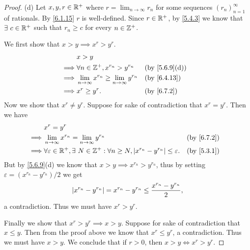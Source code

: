 \begin{proof}{(d)}
  Let \(x, y, r \in \mathbb{R}^+\) where \(r = \lim_{n \to \infty} r_n\) for some sequences \((r_n)_{n = 1}^\infty\) of rationals.
  By \cref{6.1.15} \(r\) is well-defined.
  Since \(r \in \mathbb{R}^+\), by \cref{5.4.3} we know that \(\exists\ c \in \mathbb{R}^+\) such that \(r_n \geq c\) for every \(n \in \mathbb{Z}^+\).

  We first show that \(x > y \implies x^r > y^r\).
  \begin{align*}
             & x > y                                                                                         \\
    \implies & \forall n \in \Z^+, x^{r_n} > y^{r_n}                        &  & \text{(by \cref{5.6.9}(d))} \\
    \implies & \lim_{n \to \infty} x^{r_n} \geq \lim_{n \to \infty} y^{r_n} &  & \text{(by \cref{6.4.13})}   \\
    \implies & x^r \geq y^r.                                                &  & \by{6.7.2}
  \end{align*}
  Now we show that \(x^r \neq y^r\).
  Suppose for sake of contradiction that \(x^r = y^r\).
  Then we have
  \begin{align*}
             & x^r = y^r                                                                                                                       \\
    \implies & \lim_{n \to \infty} x^{r_n} = \lim_{n \to \infty} y^{r_n}                                                       &  & \by{6.7.2} \\
    \implies & \forall \varepsilon \in \R^+, \exists\ N \in \Z^+ : \forall n \geq N, \abs{x^{r_n} - y^{r_n}} \leq \varepsilon. &  & \by{5.3.1}
  \end{align*}
  But by \cref{5.6.9}(d) we know that \(x > y \implies x^{r_n} > y^{r_n}\), thus by setting \(\varepsilon = (x^{r_n} - y^{r_n}) / 2\) we get
  \[
    \left\lvert x^{r_n} - y^{r_n}\right\rvert = x^{r_n} - y^{r_n} \leq \dfrac{x^{r_n} - y^{r_n}}{2},
  \]
  a contradiction.
  Thus we must have \(x^r > y^r\).

  Finally we show that \(x^r > y^r \implies x > y\).
  Suppose for sake of contradiction that \(x \leq y\).
  Then from the proof above we know that \(x^r \leq y^r\), a contradiction.
  Thus we must have \(x > y\).
  We conclude that if \(r > 0\), then \(x > y \iff x^r > y^r\).
\end{proof}

